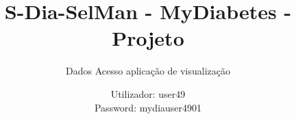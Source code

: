 \documentclass[handout]{beamer}
\title{S-Dia-SelMan - MyDiabetes - Projeto}
\subtitle{Dados Acesso aplicação de visualização}
\author{Utilizador: user49\\
Password: mydiauser4901}
\date{}
\institute{\url{mydiabetes@dcc.fc.up.pt}\\\url{http://mydiabetes.dcc.fc.up.pt/}}
\begin{document}
\begin{frame}[plain,t]
\titlepage
\end{frame}
\end{document}

